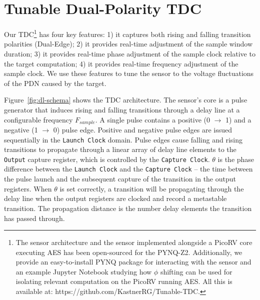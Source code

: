\section{Tunable Dual-Polarity TDC}
\label{sensor_structure}
Our \name TDC\footnote{The sensor architecture and the sensor implemented alongside a PicoRV core executing AES has been open-sourced for the PYNQ-Z2. Additionally, we provide an easy-to-install PYNQ package for interacting with the sensor and an example Jupyter Notebook studying how $\phi$ shifting can be used for isolating relevant computation on the PicoRV running AES. All this is available at: https://github.com/KastnerRG/Tunable-TDC.} has four key features: 1) it captures both rising and falling transition polarities (Dual-Edge); 2) it provides real-time adjustment of the sample window duration; 3) it provides real-time phase adjustment of the sample clock relative to the target computation; 4) it provides real-time frequency adjustment of the sample clock. We use these features to tune the sensor to the voltage fluctuations of the PDN caused by the target.





Figure~\ref{fig:dl-schema} shows the \name TDC architecture.
The sensor's core is a pulse generator that induces rising and falling transitions through a delay line at a configurable frequency $F_{sample}$.
A single pulse contains a positive (0 $\rightarrow$ 1) and a negative (1 $\rightarrow$ 0) pulse edge.
Positive and negative pulse edges are issued sequentially in the \texttt{Launch Clock} domain.
Pulse edges cause falling and rising transitions to propagate through a linear array of delay line elements to the \texttt{Output} capture register, which is controlled by the \texttt{Capture Clock}.
$\theta$ is the phase difference between the \texttt{Launch Clock} and the \texttt{Capture Clock} -- the time between the pulse launch and the subsequent capture of the transition in the output registers.
When $\theta$ is set correctly, a transition will be propagating through the delay line when the output registers are clocked and record a metastable transition.
The propagation distance is the number delay elements the transition has passed through. 

